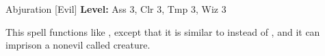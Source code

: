 {Abjuration [Evil]}
{
	\textbf{Level:}
	Ass 3, Clr 3, Tmp 3, Wiz 3\\
}
{
	This spell functions like , except that it is similar to  instead of , and it can imprison a nonevil called creature.

}
